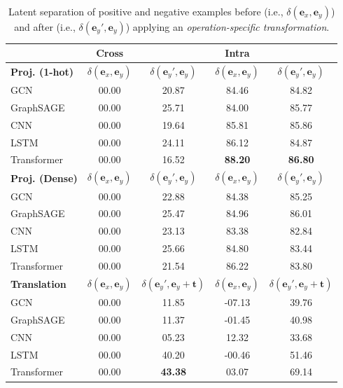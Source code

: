 \documentclass[11pt]{article}
\begin{document}
\begin{table}[t]
    \tiny
    \centering
    \begin{tabular}{l|cc|cc}
       \toprule
        & \textbf{Cross} & & \textbf{Intra} &\\
       \midrule
       \textbf{Proj. (1-hot)} & $\delta(\textbf{e}_x, \textbf{e}_y)$ & $\delta(\textbf{e}_{y}', \textbf{e}_y)$& $\delta(\textbf{e}_x, \textbf{e}_y)$ & $\delta(\textbf{e}_{y}', \textbf{e}_y)$\\
       \midrule
       GCN & 00.00 & 20.87  & 84.46 & 84.82\\
       GraphSAGE & 00.00 & 25.71 & 84.00 & 85.77\\
       \midrule
       CNN & 00.00 & 19.64 & 85.81 & 85.86\\
       LSTM & 00.00 & 24.11 & 86.12 & 84.87 \\
       Transformer & 00.00 & 16.52 & \textbf{88.20} & \textbf{86.80}\\
       \midrule
       \textbf{Proj. (Dense)} & $\delta(\textbf{e}_x, \textbf{e}_y)$ & $\delta(\textbf{e}_{y}', \textbf{e}_y)$& $\delta(\textbf{e}_x, \textbf{e}_y)$ & $\delta(\textbf{e}_{y}', \textbf{e}_y)$\\
       \midrule
       GCN & 00.00 & 22.88  & 84.38 & 85.25\\
       GraphSAGE & 00.00 & 25.47 & 84.96 & 86.01\\
       \midrule
       CNN & 00.00 & 23.13 & 83.38 & 82.84\\
       LSTM & 00.00 & 25.66 & 84.80 & 83.44 \\
       Transformer & 00.00 & 21.54 & 86.22 & 83.80\\
       \midrule
       \textbf{Translation} & $\delta(\textbf{e}_x, \textbf{e}_y)$ & $\delta(\textbf{e}_{y}', \textbf{e}_y + \textbf{t})$& $\delta(\textbf{e}_x, \textbf{e}_y)$ & $\delta(\textbf{e}_{y}', \textbf{e}_y + \textbf{t})$\\
       \midrule
       GCN & 00.00 & 11.85 & -07.13 & 39.76\\
       GraphSAGE & 00.00 & 11.37 & -01.45 & 40.98\\
       \midrule
       CNN & 00.00 & 05.23 & 12.32 & 33.68\\
       LSTM  & 00.00 & 40.20 & -00.46 & 51.46\\
       Transformer & 00.00 & \textbf{43.38} & 03.07 & 69.14\\
       \bottomrule
    \end{tabular}
    \caption{Latent separation of positive and negative examples before (i.e., $\delta(\textbf{e}_x, \textbf{e}_y)$) and after (i.e., $\delta(\textbf{e}_{y}', \textbf{e}_y)$) applying an \emph{operation-specific transformation}.}
    \label{tab:compare_latent}
\end{table}
\end{document}
